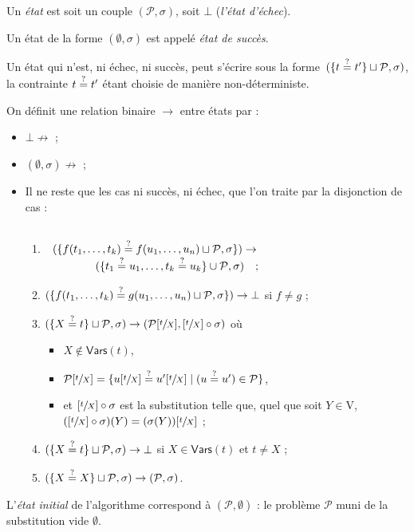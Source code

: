 \documentclass[../main]{subfiles}
\begin{document}
  \begin{defn}
    Un \textit{état} est soit un couple $(\mathcal{P}, \sigma)$, soit $\bot$ (\textit{l'état d'échec}).

    Un état de la forme $(\emptyset, \sigma)$ est appelé \textit{état de succès}.

    Un état qui n'est, ni échec, ni succès, peut s'écrire sous la forme~$(\{t \mathrel{\overset ? =} t'\} \sqcup \mathcal{P}, \sigma)$, la contrainte $t \mathrel{\overset ? =} t'$ étant choisie de manière non-déterministe.
    
    On définit une relation binaire $\to$ entre états par :
    \begin{itemize}
      \item  $\bot \not\to$ ;
      \item  $(\emptyset,\sigma) \not\to$ ;
      \item Il ne reste que les cas ni succès, ni échec, que l'on traite par la disjonction de cas :
        \begin{enumerate}
          \item $ \begin{array}{c}
              \\
              (\{f(t_1,\mathinner{\ldotp\ldotp\ldotp},t_k) \mathrel{\overset ? =} f(u_1,\mathinner{\ldotp\ldotp\ldotp}, u_n) \sqcup \mathcal{P}, \sigma\}) \to\\
              \quad\quad\quad\quad(\{t_1 \mathrel{\overset ? =} u_1, \mathinner{\ldotp\ldotp\ldotp}, t_k \mathrel{\overset ? =} u_k\} \cup \mathcal{P}, \sigma) \quad ;
            \end{array} $ \label{chap4-unification-match1}
          \item $(\{f(t_1,\mathinner{\ldotp\ldotp\ldotp},t_k) \mathrel{\overset ? =} g(u_1,\mathinner{\ldotp\ldotp\ldotp}, u_n) \sqcup \mathcal{P}, \sigma\}) \to \bot$ si $f \neq g$ ; \label{chap4-unification-match2}
          \item $(\{X\mathrel{\overset ? =} t\} \sqcup \mathcal{P}, \sigma) \to (\mathcal{P}[\sfrac{t}{X}], [\sfrac{t}{X}] \circ \sigma)$ où \label{chap4-unification-match3}
            \begin{itemize}
              \item $X \not\in \mathsf{Vars}(t)$,
              \item $\mathcal{P}[\sfrac{t}{X}] = \{u[\sfrac{t}{X}] \mathrel{\overset ? =} u'[\sfrac{t}{X}]  \mid (u\mathrel{\overset ? =} u') \in \mathcal{P}\}$,
              \item et $[\sfrac{t}{X}] \circ \sigma$ est la substitution telle que, quel que soit $Y \in \mathrm{V}$, $([\sfrac{t}{X}] \circ \sigma)(Y) = (\sigma(Y))[\sfrac{t}{X}]$ ;
            \end{itemize}
          \item $(\{X \mathrel{\overset ? =} t\}\sqcup \mathcal{P}, \sigma) \to \bot$ si $X \in \mathsf{Vars}(t)$ et $t \neq X$ ; \label{chap4-unification-match4}
          \item $(\{X \mathrel{\overset ? =} X\}\sqcup \mathcal{P}, \sigma) \to (\mathcal{P}, \sigma)$. \label{chap4-unification-match5}
        \end{enumerate}
    \end{itemize}

    L'\textit{état initial} de l'algorithme correspond à $(\mathcal{P}, \emptyset)$ : le problème $\mathcal{P}$ muni de la substitution vide $\emptyset$.
  \end{defn}
\end{document}
